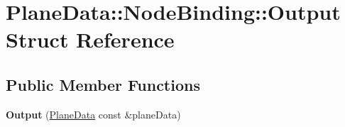 \hypertarget{struct_plane_data_1_1_node_binding_1_1_output}{}\section{Plane\+Data\+:\+:Node\+Binding\+:\+:Output Struct Reference}
\label{struct_plane_data_1_1_node_binding_1_1_output}
\subsection*{Public Member Functions}
\begin{DoxyCompactItemize}
\item 
\mbox{\label{struct_plane_data_1_1_node_binding_1_1_output_a8fe48243aa3ffce9eb1f54656eabf411}} 
{\bfseries Output} (\hyperlink{class_plane_data}{Plane\+Data} const \&plane\+Data)
\end{DoxyCompactItemize}
